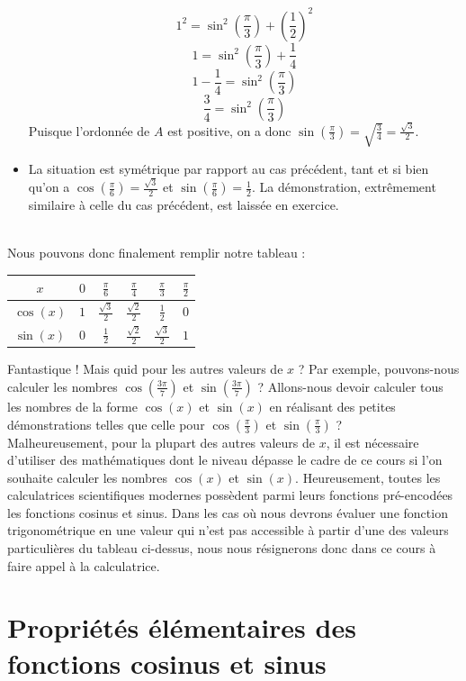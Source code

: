 \documentclass[a4paper,fontsize=13pt]{scrreprt}
\theoremstyle{plain}
\theoremstyle{definition}
\begin{document}
\begin{itemize}
$${1}^{2}=\sin^2(\frac{\pi}{3})+\left(\frac{1}{2}\right)^2$$
$$1=\sin^2(\frac{\pi}{3})+\frac{1}{4}$$
$$1-\frac{1}{4}=\sin^2(\frac{\pi}{3})$$
$$\frac{3}{4}=\sin^2(\frac{\pi}{3})$$
Puisque l'ordonnée de $A$ est positive, on a donc $\sin(\frac{\pi}{3}) = \sqrt{\frac{3}{4}} = \frac{\sqrt{3}}{2}$.
\item La situation est symétrique par rapport au cas précédent, tant et si bien qu'on a $\cos(\frac{\pi}{6}) = \frac{\sqrt{3}}{2}$ et $\sin(\frac{\pi}{6}) = \frac{1}{2}$. La démonstration, extrêmement similaire à celle du cas précédent, est laissée en exercice.
\end{itemize}~\\
Nous pouvons donc finalement remplir notre tableau :
\begin{center}
\begin{Large}
\begin{tabular}{|c|c|c|c|c|c|}
  \hline
  $x$ & $0$ & $\frac{\pi}{6}$ & $\frac{\pi}{4}$ & $\frac{\pi}{3}$ & $\frac{\pi}{2}$\\
  \hline
  $\cos(x)$ & $1$ & $\frac{\sqrt{3}}{2}$ & $\frac{\sqrt{2}}{2}$ & $\frac{1}{2}$ & $0$ \\
  \hline
  $\sin(x)$ & $0$ & $\frac{1}{2}$ & $\frac{\sqrt{2}}{2}$ & $\frac{\sqrt{3}}{2}$ & $1$ \\
  \hline
\end{tabular}
\end{Large}
\end{center}
Fantastique ! Mais quid pour les autres valeurs de $x$ ? Par exemple, pouvons-nous calculer les nombres $\cos (\frac{3\pi}{7})$ et $\sin (\frac{3\pi}{7})$ ? Allons-nous devoir calculer tous les nombres de la forme $\cos(x)$ et $\sin(x)$ en réalisant des petites démonstrations telles que celle pour $\cos (\frac{\pi}{3})$ et $\sin (\frac{\pi}{3})$ ? \\
Malheureusement, pour la plupart des autres valeurs de $x$, il est nécessaire d'utiliser des mathématiques dont le niveau dépasse le cadre de ce cours si l'on souhaite calculer les nombres $\cos(x)$ et $\sin(x)$. Heureusement, toutes les calculatrices scientifiques modernes possèdent parmi leurs fonctions pré-encodées les fonctions cosinus et sinus. Dans les cas où nous devrons évaluer une fonction trigonométrique en une valeur qui n'est pas accessible à partir d'une des valeurs particulières du tableau ci-dessus, nous nous résignerons donc dans ce cours à faire appel à la calculatrice.

\section{Propriétés élémentaires des fonctions cosinus et sinus}
\end{document}
